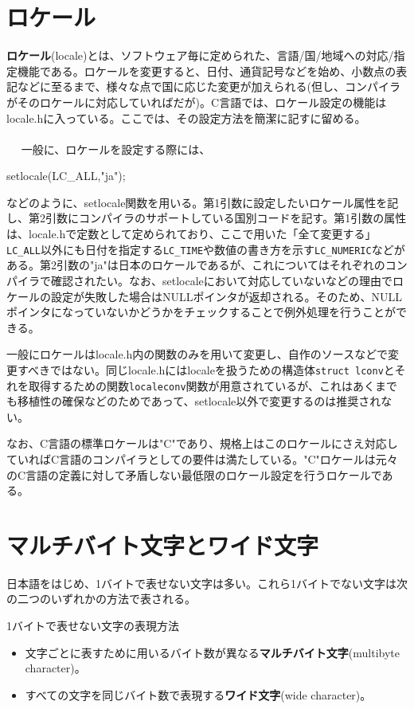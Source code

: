 \section{ロケール}
\textbf{ロケール}(locale)とは、ソフトウェア毎に定められた、言語/国/地域への対応/指定機能である。ロケールを変更すると、日付、通貨記号などを始め、小数点の表記などに至るまで、様々な点で国に応じた変更が加えられる(但し、コンパイラがそのロケールに対応していればだが)。C言語では、ロケール設定の機能はlocale.hに入っている。ここでは、その設定方法を簡潔に記すに留める。
\\ \\　
一般に、ロケールを設定する際には、
\begin{code}
setlocale(LC_ALL,"ja");
\end{code}
などのように、setlocale関数を用いる。第1引数に設定したいロケール属性を記し、第2引数にコンパイラのサポートしている国別コードを記す。第1引数の属性は、locale.hで定数として定められており、ここで用いた「全て変更する」\verb|LC_ALL|以外にも日付を指定する\verb|LC_TIME|や数値の書き方を示す\verb|LC_NUMERIC|などがある。第2引数の"ja"は日本のロケールであるが、これについてはそれぞれのコンパイラで確認されたい。なお、setlocaleにおいて対応していないなどの理由でロケールの設定が失敗した場合はNULLポインタが返却される。そのため、NULLポインタになっていないかどうかをチェックすることで例外処理を行うことができる。

一般にロケールはlocale.h内の関数のみを用いて変更し、自作のソースなどで変更すべきではない。同じlocale.hにはlocaleを扱うための構造体\verb|struct lconv|とそれを取得するための関数\verb|localeconv|関数が用意されているが、これはあくまでも移植性の確保などのためであって、setlocale以外で変更するのは推奨されない。

なお、C言語の標準ロケールは"C"であり、規格上はこのロケールにさえ対応していればC言語のコンパイラとしての要件は満たしている。"C"ロケールは元々のC言語の定義に対して矛盾しない最低限のロケール設定を行うロケールである。

\section{マルチバイト文字とワイド文字}
日本語をはじめ、1バイトで表せない文字は多い。これら1バイトでない文字は次の二つのいずれかの方法で表される。
\begin{itembox}[l]{1バイトで表せない文字の表現方法}
\begin{itemize}
\item 文字ごとに表すために用いるバイト数が異なる\textbf{マルチバイト文字}(multibyte character)。
\item すべての文字を同じバイト数で表現する\textbf{ワイド文字}(wide character)。
\end{itemize}
\end{itembox}

